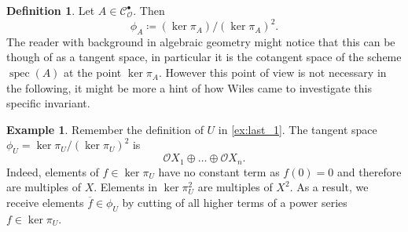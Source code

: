 \documentclass{article}
\theoremstyle{plain}%
\theoremstyle{definition}
\newtheorem{definition}{Definition}[section]
\newtheorem{example}{Example}[section]
\theoremstyle{remark}
\newcommand{\cob}{\mathcal{C}_\mathcal{O}^\bullet}
\begin{document}
    \begin{definition}
        Let \(A \in \cob\). Then
        \[\phi_A \coloneqq (\ker \pi_A)/(\ker \pi_A)^2.\]
        The reader with background in algebraic geometry might notice that this can be though of as a tangent space, 
        in particular it is the cotangent space of the scheme \(\operatorname{spec}(A)\) at the point \(\ker \pi_A\).
        However this point of view is not necessary in the following, 
        it might be more a hint of how Wiles came to investigate this specific invariant.
    \end{definition}

    \begin{example}\label{ex:last_phi}
        Remember the definition of \(U\) in \cref{ex:last_1}.
        The tangent space \(\phi_U = \ker \pi_U/(\ker \pi_U)^2\) is
        \[
            \mathcal{O}X_1 \oplus \dots \oplus \mathcal{O}X_n.
        \]
        Indeed, elements of \(f \in \ker \pi_U\) have no constant term as \(f(0) = 0\) and therefore are multiples of \(X\).
        Elements in \(\ker \pi_U^2\) are multiples of \(X^2\). As a result, we receive elements \(\overline{f} \in \phi_U\) by
        cutting of all higher terms of a power series \(f \in \ker \pi_U\).
    \end{example}
\end{document}
